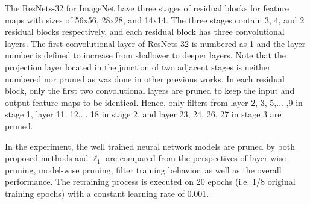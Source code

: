 \documentclass{article} %
\begin{document}
The ResNets-32 for ImageNet have three stages of residual blocks for feature maps with sizes of 56x56, 28x28, and 14x14.
	The three stages contain 3, 4, and 2 residual blocks respectively, and each residual block has three convolutional layers.
	The first convolutional layer of ResNets-32 is numbered as 1 and the layer number is defined to increase from shallower to deeper layers.
	Note that the projection layer located in the junction of two adjacent stages is neither numbered nor pruned as was done in other previous works.
	In each residual block, only the first two convolutional layers are pruned to keep the input and output feature maps to be identical.
	Hence, only filters from layer 2, 3, 5,... ,9 in stage 1, layer 11, 12,... 18 in stage 2, and layer 23, 24, 26, 27 in stage 3 are pruned.

In the experiment, the well trained neural network models are pruned by both proposed methods and $\ell_1$ are compared from the perspectives of layer-wise pruning, model-wise pruning, filter training behavior, as well as the overall performance.
The retraining process is executed on 20 epochs (i.e. 1/8 original training epochs) with a constant learning rate of 0.001.
\end{document}
